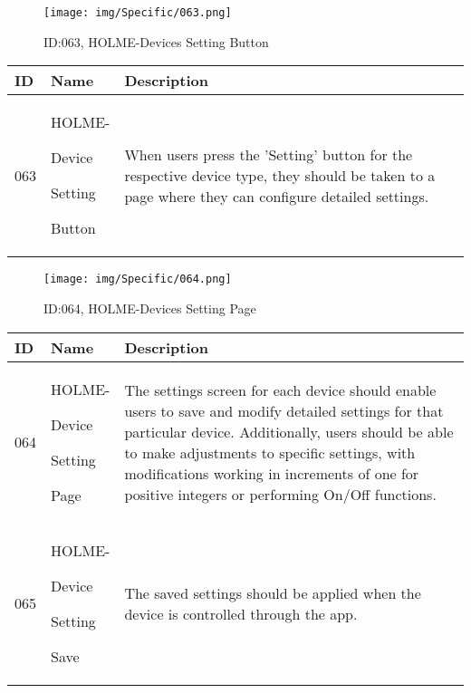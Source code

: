 \documentclass[conference]{IEEEtran}
\begin{document}
\begin{enumerate}
\vspace{3cm}
\begin{figure}[h]
\centering
\texttt{[image: img/Specific/063.png]}
\caption{ID:063, HOLME-Devices Setting Button}
\end{figure}
\begin{table}[h]
\def\arraystretch{1.2} \small
    \begin{tabular}{|p{1cm}|p{1.8cm}|p{5.0cm}|}
        \hline
        ID & Name & Description\\ \hline
         063 \par  & HOLME-\par Device \par Setting \par Button  & When users press the 'Setting' button for the respective device type, they should be taken to a page where they can configure detailed settings. \\ \hline
    \end{tabular}
\end{table}

\begin{figure}[h]
\centering
\texttt{[image: img/Specific/064.png]}
\caption{ID:064, HOLME-Devices Setting Page}
\end{figure}
\begin{table}[h]
\def\arraystretch{1.2} \small
    \begin{tabular}{|p{1cm}|p{1.8cm}|p{5.0cm}|}
        \hline
        ID & Name & Description\\ \hline
         064 \par  & HOLME-\par Device \par Setting \par Page  & 
The settings screen for each device should enable users to save and modify detailed settings for that particular device. Additionally, users should be able to make adjustments to specific settings, with modifications working in increments of one for positive integers or performing On/Off functions. \\ \hline
         065 \par  & HOLME-\par Device \par Setting \par Save  & The saved settings should be applied when the device is controlled through the app. \\ \hline
    \end{tabular}
\end{table}
\clearpage


\end{enumerate}
\end{document}

